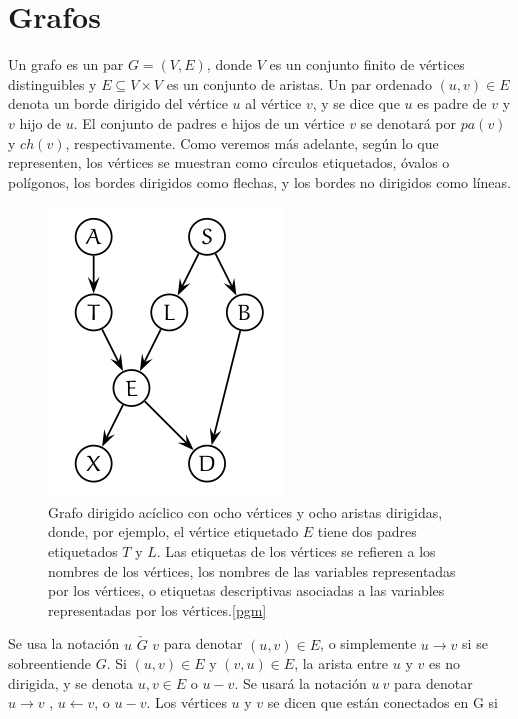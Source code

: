 \section{Grafos}
Un grafo es un par $G = (V, E)$, donde $V$ es un conjunto finito de vértices distinguibles y 
$E \subseteq V \times V$ es un conjunto de aristas. Un par ordenado $(u, v) \in E$ denota un borde dirigido
del vértice $u$ al vértice $v$, y se dice que $u$ es padre de $v$ y $v$ hijo de $u$.
El conjunto de padres e hijos de un vértice $v$ se denotará por $pa(v)$ y $ch(v)$, respectivamente.
Como veremos más adelante, según lo que representen, los vértices se muestran como círculos 
etiquetados, óvalos o polígonos, los bordes dirigidos como flechas, y los 
bordes no dirigidos como líneas.

\begin{figure}[h!]
    \centering
    \includegraphics[scale=0.5]{./img/dag.png}
    \caption{Grafo dirigido acíclico con ocho vértices y ocho aristas dirigidas, donde, por ejemplo, el vértice 
    etiquetado $E$ tiene dos padres etiquetados $T$ y $L$. Las etiquetas de los vértices se 
    refieren a los nombres de los vértices, los nombres de las variables representadas por 
     los vértices, o etiquetas descriptivas asociadas a las variables representadas por los vértices.\ref{pgm}}
    \label{img:dag1}
\end{figure}
    
Se usa la notación $u$ $\underrightarrow{G}$ $v$ para denotar $(u,v) \in E$, o simplemente 
$u \rightarrow v$ si se sobreentiende $G$. Si $(u,v) \in E$ y $(v,u) \in E$, la arista 
entre $u$ y $v$ es no dirigida, y se denota ${u,v} \in E$ o $u - v$. Se usará la notación 
$u ~ v$ para denotar $u \rightarrow v$ , $u \leftarrow v$, o $u - v$. Los vértices $u$ y $v$ 
se dicen que están conectados en G si



